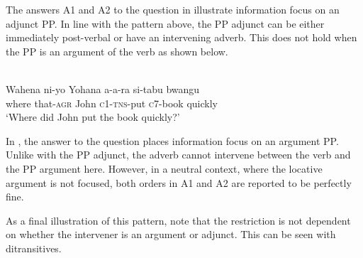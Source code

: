 \documentclass[output=paper]{langsci/langscibook}
\begin{document}
The answers A1 and A2 to the question in  illustrate information focus on an adjunct PP. In line with the pattern above, the PP adjunct can be either immediately post-verbal or have an intervening adverb. This does not hold when the PP is an argument of the verb as shown below.  


\ea\label{ex:safir:16} 
\settowidth{}
\\
\gll Wahena  ni-yo    Yohana   a-a-ra     si-tabu          bwangu \\
      where     that-\textsc{agr}   John     \textsc{c1-tns}-put   \textsc{c}7-book       quickly\\
\glt ‘Where did John put the book quickly?’  
\z
\z
{}


In , the answer to the question places information focus on an argument PP. Unlike with the PP adjunct, the adverb cannot intervene between the verb and the PP argument here. However, in a neutral context, where the locative argument is not focused, both orders in A1 and A2 are reported to be perfectly fine.

As a final illustration of this pattern, note that the restriction is not dependent on whether the intervener is an argument or adjunct. This can be seen with ditransitives. 
\end{document}
